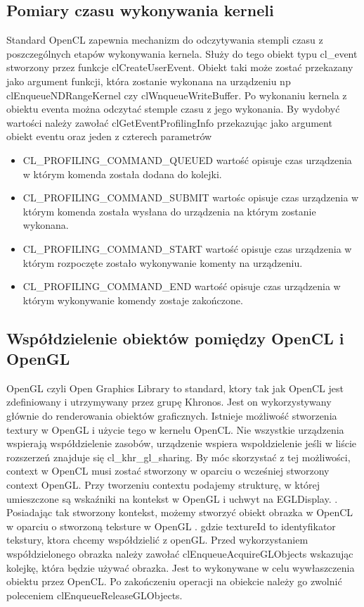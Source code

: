  \subsection{Pomiary czasu wykonywania kerneli}
 Standard OpenCL zapewnia mechanizm do odczytywania stempli czasu z poszczególnych etapów wykonywania kernela. Służy do tego obiekt typu cl\_event stworzony przez funkcje clCreateUserEvent. Obiekt taki może zostać przekazany jako argument funkcji, która zostanie wykonana na urządzeniu np clEnqueueNDRangeKernel czy clWnqueueWriteBuffer.
 Po wykonaniu kernela z obiektu eventa można odczytać stemple czasu z jego wykonania. By wydobyć wartości należy zawołać clGetEventProfilingInfo przekazując jako argument obiekt eventu oraz jeden z czterech parametrów 
 \begin{itemize}
     \item CL\_PROFILING\_COMMAND\_QUEUED wartość opisuje czas urządzenia w którym komenda została dodana do kolejki.
     \item CL\_PROFILING\_COMMAND\_SUBMIT wartośc opisuje czas urządzenia w którym komenda została wysłana do urządzenia na którym zostanie wykonana.
     \item CL\_PROFILING\_COMMAND\_START wartość opisuje czas urządzenia w którym rozpoczęte zostało wykonywanie komenty na urządzeniu.
     \item CL\_PROFILING\_COMMAND\_END wartość opisuje czas urządzenia w którym wykonywanie komendy zostaje zakończone.
\end{itemize}
\subsection [Współdzielenie obiektów pomiędzy OpenCL i OpenGL]{Współdzielenie obiektów pomiędzy OpenCL i OpenGL}
OpenGL czyli Open Graphics Library to standard, ktory tak jak OpenCL jest zdefiniowany i utrzymywany przez grupę Khronos. Jest on wykorzystywany głównie do renderowania obiektów graficznych.
Istnieje możliwość stworzenia textury w OpenGL i użycie tego w kernelu OpenCL. Nie wszystkie urządzenia wspierają współdzielenie zasobów, urządzenie wspiera wspoldzielenie jeśli w liście rozszerzeń znajduje się cl\_khr\_gl\_sharing. By móc skorzystać z tej możliwości, context w OpenCL musi zostać stworzony w oparciu o wcześniej stworzony context OpenGL. Przy tworzeniu contextu podajemy strukturę, w której umieszczone są wskaźniki na kontekst w OpenGL i uchwyt na EGLDisplay. 
 .
 Posiadając tak stworzony kontekst, możemy stworzyć obiekt obrazka w OpenCL w oparciu o stworzoną teksture w OpenGL
 . gdzie textureId to identyfikator tekstury, ktora chcemy współdzielić z openGL. 
 Przed wykorzystaniem współdzielonego obrazka należy zawołać clEnqueueAcquireGLObjects wskazując kolejkę, która będzie używać obrazka. Jest to wykonywane w celu wywłaszczenia obiektu przez OpenCL. Po zakończeniu operacji na obiekcie należy go zwolnić poleceniem clEnqueueReleaseGLObjects.
